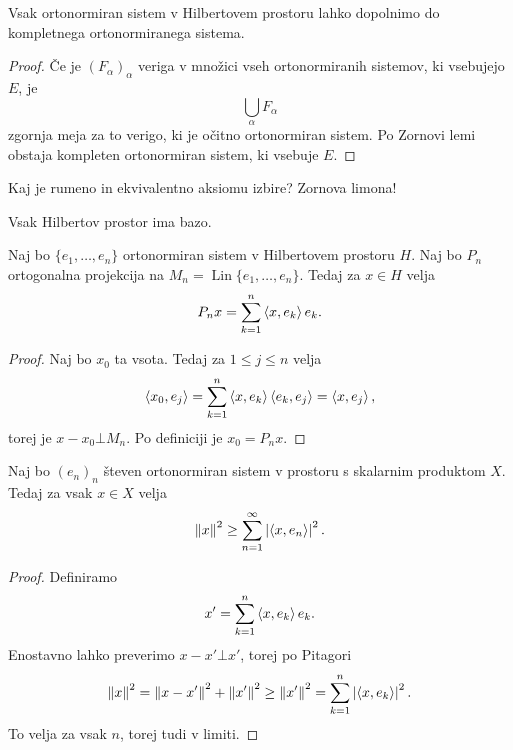 
\begin{trditev}
  Vsak ortonormiran sistem v Hilbertovem prostoru lahko dopolnimo do kompletnega
  ortonormiranega sistema.
\end{trditev}

\begin{proof}
  Če je $(F_\alpha)_\alpha$ veriga v množici vseh ortonormiranih sistemov, ki
  vsebujejo $E$, je
  \[
	\bigcup_\alpha F_\alpha
  \]
  zgornja meja za to verigo, ki je očitno ortonormiran sistem.
  Po Zornovi lemi obstaja kompleten ortonormiran sistem, ki vsebuje $E$.
\end{proof}

\begin{opomba}
  Kaj je rumeno in ekvivalentno aksiomu izbire?
  Zornova limona!
\end{opomba}

\begin{posledica}
  Vsak Hilbertov prostor ima bazo.
\end{posledica}

\begin{trditev}
  Naj bo $\{e_1, \ldots, e_n\}$ ortonormiran sistem v Hilbertovem prostoru $H$.
  Naj bo $P_n$ ortogonalna projekcija na $M_n = \operatorname{Lin} \{e_1,
  \ldots, e_n\}$.
  Tedaj za $x \in H$ velja
  \[
	P_n x = \sum_{k=1}^n \left< x, e_k \right> e_k.
  \]
\end{trditev}

\begin{proof}
  Naj bo $x_0$ ta vsota.
  Tedaj za $1 \le j \le n$ velja
  \[
	\left< x_0, e_j \right> = \sum_{k=1}^n \left< x, e_k \right> \left< e_k, e_j \right> = \left< x, e_j \right>,
  \]
  torej je $x - x_0 \bot M_n$.
  Po definiciji je $x_0 = P_n x$.
\end{proof}

\begin{trditev}
  Naj bo $(e_n)_n$ števen ortonormiran sistem v prostoru s skalarnim produktom
  $X$.
  Tedaj za vsak $x \in X$ velja
  \[
	\left\lVert x\right\rVert^2 \ge \sum_{n=1}^\infty \left| \left< x, e_n \right> \right|^2.
  \]
\end{trditev}

\begin{proof}
  Definiramo
  \[
	x' = \sum_{k=1}^n \left< x, e_k \right> e_k.
  \]
  Enostavno lahko preverimo $x - x' \bot x'$, torej po Pitagori
  \[
	\left\lVert x\right\rVert^2 = \left\lVert x - x'\right\rVert^2 + \left\lVert x'\right\rVert^2 \ge \left\lVert x'\right\rVert^2 = \sum_{k=1}^n
	\left| \left< x, e_k \right> \right|^2.
  \]
  To velja za vsak $n$, torej tudi v limiti.
\end{proof}

